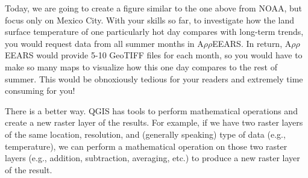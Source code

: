 \documentclass[oneside,a4paper,11pt,explicit]{book}
\begin{document}
\vspace{.5em}

Today, we are going to create a figure similar to the one above from NOAA, but focus only on Mexico City. With your skills so far, to investigate how the land surface temperature of one particularly hot day compares with long-term trends, you would request data from all summer months in A$\rho\rho$EEARS. In return, A$\rho\rho$EEARS would provide 5-10 GeoTIFF files for each month, so you would have to make so many maps to visualize how this one day compares to the rest of summer. This would be obnoxiously tedious for your readers and extremely time consuming for you!

\vspace{.5em}

There is a better way. QGIS has tools to perform mathematical operations and create a new raster layer of the results. For example, if we have two raster layers of the same location, resolution, and (generally speaking) type of data (e.g., temperature), we can perform a mathematical operation on those two raster layers (e.g., addition, subtraction, averaging, etc.) to produce a new raster layer of the result. 
\end{document}
